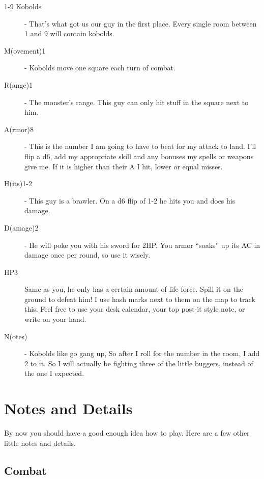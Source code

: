 \documentclass[a6paper,hidelinks]{article}
\begin{document}
\begin{description}

\item[1-9 Kobolds] - That’s what got us our guy in the first place. Every single room between 1 and 9 will contain kobolds.

\item[M(ovement)1] - Kobolds move one square each turn of combat.

\item[R(ange)1] - The monster's range. This guy can only hit stuff in the square next to him.

\item[A(rmor)8] - This is the number I am going to have to beat for my attack to land. I'll flip a d6, add my appropriate skill and any bonuses my spells or weapons give me. If it is higher than their A I hit, lower or equal misses.

\item[H(its)1-2] - This guy is a brawler. On a d6 flip of 1-2 he hits you and does his damage.

\item[D(amage)2] - He will poke you with his sword for 2HP. You armor ``soaks'' up its AC in damage once per round, so use it wisely.

\item[HP3]  Same as you, he only has a certain amount of life force. Spill it on the ground to defeat him! I use hash marks next to them on the map to track this. Feel free to use your desk calendar, your top post-it style note, or write on your hand.

\item[N(otes)] - Kobolds like go gang up, So after I roll for the number in the room, I add 2 to it. So I will actually be fighting three of the little buggers, instead of the one I expected.

\end{description}

\section{Notes and Details}

By now you should have a good enough idea how to play. Here are a few other little notes and details.

\subsection{Combat}
\end{document}
